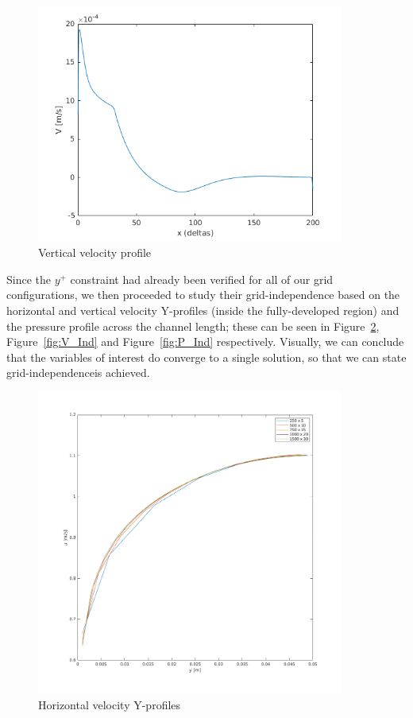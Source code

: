 \documentclass[12pt]{article}
\begin{document}
        \begin{figure}[ht!]
                \centering
                \includegraphics[width=0.9\textwidth]{V_Profile.png}
                \caption{Vertical velocity profile}
                \label{fig:V_Profile}
        \end{figure}

        Since the \( y^+ \) constraint had already been verified for all of our grid configurations, we then proceeded to study their grid-independence based on the horizontal and vertical velocity Y-profiles (inside the fully-developed region) and the pressure profile across the channel length; these can be seen in Figure~\ref{fig:U_Ind}, Figure~\ref{fig:V_Ind} and Figure~\ref{fig:P_Ind} respectively. Visually, we can conclude that the variables of interest do converge to a single solution, so that we can state grid-independenceis achieved.

        \begin{figure}[ht!]
                \centering
                \includegraphics[width=0.9\textwidth]{U_Independence.png}
                \caption{Horizontal velocity Y-profiles}
                \label{fig:U_Ind}
        \end{figure}
\end{document}
